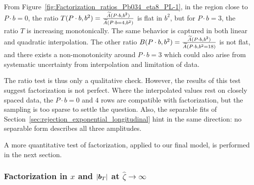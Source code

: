 From Figure~\ref{fig:Factorization_ratios_Pb034_eta8_PL-1}, in the region close to $P\cdot b=0$, the ratio $T(P\cdot b, b^2) = \frac{\widetilde{A}(P\cdot b, b^2)}{\widetilde{A}(P\cdot b = 4, b^2)}$ is flat in $b^2$, but for $P\cdot b=3$, the ratio $T$ is increasing monotonically. The same behavior is captured in both linear and quadratic interpolation. The other ratio $B(P\cdot b, b^2) = \frac{\widetilde{A}(P\cdot b, b^2)}{\widetilde{A}(P\cdot b, b^2 = 18)}$ is not flat, and there exists a non-monotonicity around $P\cdot b=3$ which could also arise from systematic uncertainty from interpolation and limitation of data. 

The ratio test is thus only a qualitative check. However, the results of this test suggest factorization is not perfect. Where the interpolated values rest on closely spaced data, the $P\cdot b = 0$ and $4$ rows are compatible with factorization, but the sampling is too sparse to settle the question. Also, the separable fits of Section~\ref{sec:rejection_exponential_longitudinal} hint in the same direction: no separable form describes all three amplitudes.

A more quantitative test of factorization, applied to our final model, is performed in the next section.

\subsubsection{Factorization in \texorpdfstring{$x$}{x} and \texorpdfstring{$|\boldsymbol{b}_T|$}{|bT|} at \texorpdfstring{$\hat{\zeta} \to \infty$}{zeta-hat to infinity}}
\label{sec:factorization_xbt_form}


